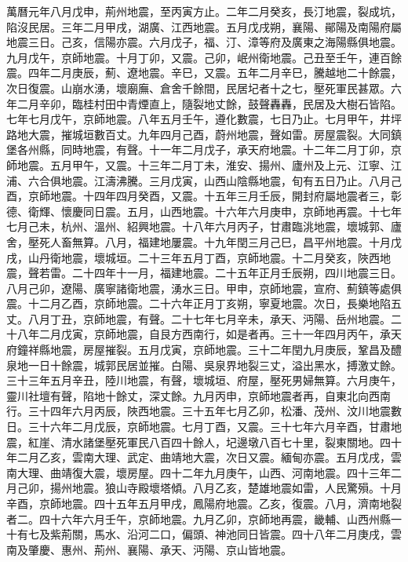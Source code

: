 \begin{pinyinscope}
萬曆元年八月戊申，荊州地震，至丙寅方止。二年二月癸亥，長汀地震，裂成坑，陷沒民居。三年二月甲戌，湖廣、江西地震。五月戊戌朔，襄陽、鄖陽及南陽府屬地震三日。己亥，信陽亦震。六月戊子，福、汀、漳等府及廣東之海陽縣俱地震。九月戊午，京師地震。十月丁卯，又震。己卯，岷州衛地震。己丑至壬午，連百餘震。四年二月庚辰，薊、遼地震。辛巳，又震。五年二月辛巳，騰越地二十餘震，次日復震。山崩水湧，壞廟廡、倉舍千餘間，民居圮者十之七，壓死軍民甚眾。六年二月辛卯，臨桂村田中青煙直上，隨裂地丈餘，鼓聲轟轟，民居及大樹石皆陷。七年七月戊午，京師地震。八年五月壬午，遵化數震，七日乃止。七月甲午，井坪路地大震，摧城垣數百丈。九年四月己酉，蔚州地震，聲如雷。房屋震裂。大同鎮堡各州縣，同時地震，有聲。十一年二月戊子，承天府地震。十二年二月丁卯，京師地震。五月甲午，又震。十三年二月丁未，淮安、揚州、廬州及上元、江寧、江浦、六合俱地震。江濤沸騰。三月戊寅，山西山陰縣地震，旬有五日乃止。八月己酉，京師地震。十四年四月癸酉，又震。十五年三月壬辰，開封府屬地震者三，彰德、衛輝、懷慶同日震。五月，山西地震。十六年六月庚申，京師地再震。十七年七月己未，杭州、溫州、紹興地震。十八年六月丙子，甘肅臨洮地震，壞城郭、廬舍，壓死人畜無算。八月，福建地屢震。十九年閏三月己巳，昌平州地震。十月戊戌，山丹衛地震，壞城垣。二十三年五月丁酉，京師地震。十二月癸亥，陜西地震，聲若雷。二十四年十一月，福建地震。二十五年正月壬辰朔，四川地震三日。八月己卯，遼陽、廣寧諸衛地震，湧水三日。甲申，京師地震，宣府、薊鎮等處俱震。十二月乙酉，京師地震。二十六年正月丁亥朔，寧夏地震。次日，長樂地陷五丈。八月丁丑，京師地震，有聲。二十七年七月辛未，承天、沔陽、岳州地震。二十八年二月戊寅，京師地震，自艮方西南行，如是者再。三十一年四月丙午，承天府鐘祥縣地震，房屋摧裂。五月戊寅，京師地震。三十二年閏九月庚辰，鞏昌及醴泉地一日十餘震，城郭民居並摧。白陽、吳泉界地裂三丈，溢出黑水，搏激丈餘。三十三年五月辛丑，陸川地震，有聲，壞城垣、府屋，壓死男婦無算。六月庚午，靈川社壇有聲，陷地十餘丈，深丈餘。九月丙申，京師地震者再，自東北向西南行。三十四年六月丙辰，陜西地震。三十五年七月乙卯，松潘、茂州、汶川地震數日。三十六年二月戊辰，京師地震。七月丁酉，又震。三十七年六月辛酉，甘肅地震，紅崖、清水諸堡壓死軍民八百四十餘人，圮邊墩八百七十里，裂東關地。四十年二月乙亥，雲南大理、武定、曲靖地大震，次日又震。緬甸亦震。五月戊戌，雲南大理、曲靖復大震，壞房屋。四十二年九月庚午，山西、河南地震。四十三年二月己卯，揚州地震。狼山寺殿壞塔傾。八月乙亥，楚雄地震如雷，人民驚殞。十月辛酉，京師地震。四十五年五月甲戌，鳳陽府地震。乙亥，復震。八月，濟南地裂者二。四十六年六月壬午，京師地震。九月乙卯，京師地再震，畿輔、山西州縣一十有七及紫荊關，馬水、沿河二口，偏頭、神池同日皆震。四十八年二月庚戌，雲南及肇慶、惠州、荊州、襄陽、承天、沔陽、京山皆地震。


\end{pinyinscope}
